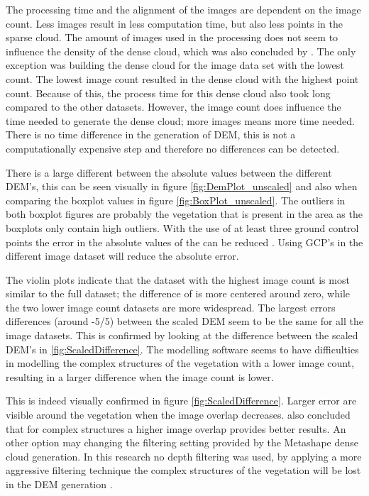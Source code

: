 \documentclass{isprs} %
\begin{document}
The processing time and the alignment of the images are dependent on the image count.
Less images result in less computation time, but also less points in the sparse cloud.
The amount of images used in the processing does not seem to influence the density of the dense cloud, which was also concluded by \citet{EffectofUABimgcamover}. 
The only exception was building the dense cloud for the image data set with the lowest count. 
The lowest image count resulted in the dense cloud with the highest point count.
Because of this, the process time for this dense cloud also took long compared to the other datasets.
However, the image count does influence the time needed to generate the dense cloud; more images means more time needed.
There is no time difference in the generation of DEM, this is not a computationally expensive step and therefore no differences can be detected.

There is a large different between the absolute values between the different DEM's, this can be seen visually in figure \ref{fig:DemPlot_unscaled} and also when comparing the boxplot values in figure \ref{fig:BoxPlot_unscaled}.
The outliers in both boxplot figures are probably the vegetation that is present in the area as the boxplots only contain high outliers.
With the use of at least three ground control points the error in the absolute values of the can be reduced \citep{AssessingUAVGCPS, GCPbetterAccuracy, GeoreferencedPointClouds}.
Using GCP's in the different image dataset will reduce the absolute error.

The violin plots indicate that the dataset with the highest image count is most similar to the full dataset; the difference of is more centered around zero, while the two lower image count datasets are more widespread.
The largest errors differences (around -5/5) between the scaled DEM seem to be the same for all the image datasets.
This is confirmed by looking at the difference between the scaled DEM's in \ref{fig:ScaledDifference}.
The modelling software seems to have difficulties in modelling the complex structures of the vegetation with a lower image count, resulting in a larger difference when the image count is lower.

This is indeed visually confirmed in figure \ref{fig:ScaledDifference}. 
Larger error are visible around the vegetation when the image overlap decreases.
\citet{AccessingImageOverlap} also concluded that for complex structures a higher image overlap provides better results.
An other option may changing the filtering setting provided by the Metashape dense cloud generation.
In this research no depth filtering was used, by applying a more aggressive filtering technique the complex structures of the vegetation will be lost in the DEM generation \citep{AgisoftMetashape}.
\end{document}
